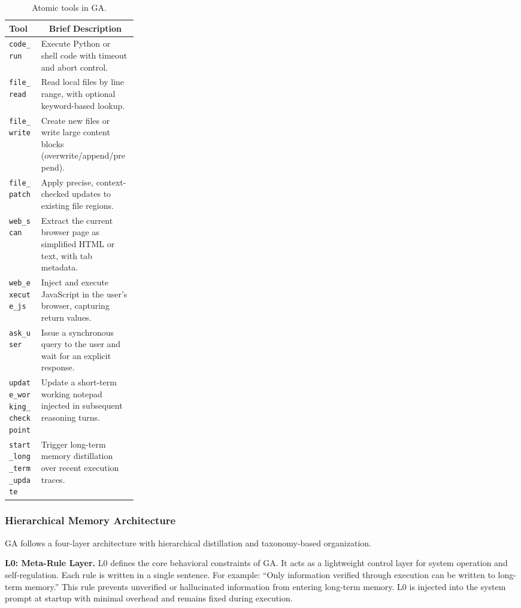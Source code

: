 \begin{table}[t]
    \centering
    \caption{Atomic tools in GA.}
    \label{tab:tools}
    {\footnotesize
    \setlength{\tabcolsep}{1.2pt}
    \renewcommand{\arraystretch}{0.9}
    \begin{tabularx}{\linewidth}{@{}p{0.25\linewidth}@{\hspace{4pt}}X@{}}
    \toprule
    \rowcolor{blue!8}
    \textbf{Tool} & \multicolumn{1}{c}{\textbf{Brief Description}} \\
    \midrule
    \mbox{\texttt{code\_run}} &
    Execute Python or shell code with timeout and abort control. \\
    \mbox{\texttt{file\_read}} &
    Read local files by line range, with optional keyword-based lookup. \\
    \mbox{\texttt{file\_write}} &
    Create new files or write large content blocks (overwrite/append/prepend). \\
    \mbox{\texttt{file\_patch}} &
    Apply precise, context-checked updates to existing file regions. \\
    \mbox{\texttt{web\_scan}} &
    Extract the current browser page as simplified HTML or text, with tab metadata. \\
    \mbox{\texttt{web\_execute\_js}} &
    Inject and execute JavaScript in the user’s browser, capturing return values. \\
    \mbox{\texttt{ask\_user}} &
    Issue a synchronous query to the user and wait for an explicit response. \\
    \mbox{\texttt{update\_working\_checkpoint}} &
    Update a short-term working notepad injected in subsequent reasoning turns. \\
    \mbox{\texttt{start\_long\_term\_update}} &
    Trigger long-term memory distillation over recent execution traces. \\
    \bottomrule
    \end{tabularx}
    }
\end{table}

\subsubsection{Hierarchical Memory Architecture}
\label{sec:memory}
GA follows a four-layer architecture with hierarchical distillation and taxonomy-based organization.

\textbf{L0: Meta-Rule Layer.}  L0 defines the core behavioral constraints of GA. It acts as a lightweight control layer for system operation and self-regulation. Each rule is written in a single sentence. For example: ``Only information verified through execution can be written to long-term memory.'' This rule prevents unverified or hallucinated information from entering long-term memory. L0 is injected into the system prompt at startup with minimal overhead and remains fixed during execution.

